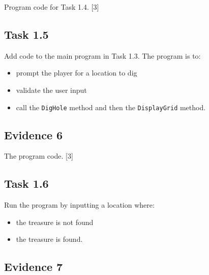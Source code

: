 Program code for Task 1.4. \hfill{}{[}3{]}

\subsection*{Task 1.5 }

Add code to the main program in Task 1.3. The program is to: 
\begin{itemize}
\item prompt the player for a location to dig 
\item validate the user input
\item call the \texttt{DigHole} method and then the \texttt{DisplayGrid}
method. 
\end{itemize}

\subsection*{Evidence 6 }

The program code.\hfill{} {[}3{]}

\subsection*{Task 1.6}

Run the program by inputting a location where: 
\begin{itemize}
\item the treasure is not found
\item the treasure is found. 
\end{itemize}

\subsection*{Evidence 7}

